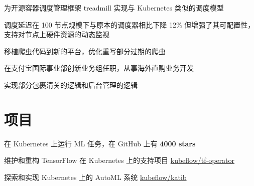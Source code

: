 \documentclass[]{deedy-resume-openfont}
\begin{document}
\begin{minipage}[t]{0.68\textwidth}
\begin{tightemize}
\item 为开源容器调度管理框架 treadmill 实现与 Kubernetes 类似的调度模型
\item 调度延迟在 100 节点规模下与原本的调度器相比下降 12\% 但增强了其可配置性，支持对节点上硬件资源的动态监视
\end{tightemize}
\sectionsep

\begin{tightemize}
\item 移植爬虫代码到新的平台，优化重写部分过期的爬虫
\end{tightemize}
\sectionsep

\begin{tightemize}
\item 在支付宝国际事业部创新业务组任职，从事海外直购业务开发
\item 实现部分包裹清关的逻辑和后台管理的逻辑
\end{tightemize}
\sectionsep


\section{项目}
\sectionsep

\begin{tightemize}
    \item 在 Kubernetes 上运行 ML 任务，在 GitHub 上有 \textbf{4000 stars}
    \item 维护和重构 TensorFlow 在 Kubernetes 上的支持项目 \href{https://github.com/kubeflow/tf-operator}{kubeflow/tf-operator}
    \item 探索和实现 Kubernetes 上的 AutoML 系统 \href{https://github.com/kubeflow/katib}{kubeflow/katib}
    \end{tightemize}
\sectionsep
\end{minipage}

\newpage
\pagestyle{fancy}
\fancyhf{}

\end{document}
